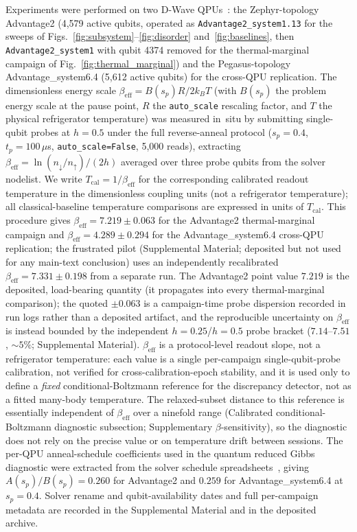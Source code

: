 \documentclass[aps,prapplied,reprint,superscriptaddress,floatfix,nofootinbib]{revtex4-2}
\begin{document}
Experiments were performed on two D-Wave QPUs~\cite{dwave2024system_docs}: the Zephyr-topology Advantage2 (4{,}579 active qubits, operated as \texttt{Advantage2\_system1.13} for the sweeps of Figs.~\ref{fig:subsystem}--\ref{fig:disorder} and~\ref{fig:baselines}, then \texttt{Advantage2\_system1} with qubit 4374 removed for the thermal-marginal campaign of Fig.~\ref{fig:thermal_marginal}) and the Pegasus-topology Advantage\_system6.4 (5{,}612 active qubits) for the cross-QPU replication.
The dimensionless energy scale $\beta_\mathrm{eff}=B(s_p)R/2k_BT$ (with $B(s_p)$ the problem energy scale at the pause point, $R$ the \texttt{auto\_scale} rescaling factor, and $T$ the physical refrigerator temperature) was measured in~situ by submitting single-qubit probes at $h=0.5$ under the full reverse-anneal protocol ($s_p=0.4$, $t_p=100\,\mu$s, \texttt{auto\_scale=False}, 5{,}000 reads), extracting $\beta_\mathrm{eff}=\ln(n_\downarrow/n_\uparrow)/(2h)$ averaged over three probe qubits from the solver nodelist.  We write $T_\mathrm{cal}=1/\beta_\mathrm{eff}$ for the corresponding calibrated readout temperature in the dimensionless coupling units (not a refrigerator temperature); all classical-baseline temperature comparisons are expressed in units of $T_\mathrm{cal}$.
This procedure gives $\beta_\mathrm{eff}=7.219\pm 0.063$ for the Advantage2 thermal-marginal campaign and $\beta_\mathrm{eff}=4.289\pm 0.294$ for the Advantage\_system6.4 cross-QPU replication; the frustrated pilot (Supplemental Material; deposited but not used for any main-text conclusion) uses an independently recalibrated $\beta_\mathrm{eff}=7.331\pm 0.198$ from a separate run.  The Advantage2 point value $7.219$ is the deposited, load-bearing quantity (it propagates into every thermal-marginal comparison); the quoted $\pm 0.063$ is a campaign-time probe dispersion recorded in run logs rather than a deposited artifact, and the reproducible uncertainty on $\beta_\mathrm{eff}$ is instead bounded by the independent $h=0.25$/$h=0.5$ probe bracket ($7.14$--$7.51$, $\sim\!5\%$; Supplemental Material).
$\beta_\mathrm{eff}$ is a protocol-level readout slope, not a refrigerator temperature: each value is a single per-campaign single-qubit-probe calibration, not verified for cross-calibration-epoch stability, and it is used only to define a \emph{fixed} conditional-Boltzmann reference for the discrepancy detector, not as a fitted many-body temperature.  The relaxed-subset distance to this reference is essentially independent of $\beta_\mathrm{eff}$ over a ninefold range (Calibrated conditional-Boltzmann diagnostic subsection; Supplementary $\beta$-sensitivity), so the diagnostic does not rely on the precise value or on temperature drift between sessions.
The per-QPU anneal-schedule coefficients used in the quantum reduced Gibbs diagnostic were extracted from the solver schedule spreadsheets~\cite{dwave2024system_docs}, giving $A(s_p)/B(s_p)=0.260$ for Advantage2 and $0.259$ for Advantage\_system6.4 at $s_p=0.4$.
Solver rename and qubit-availability dates and full per-campaign metadata are recorded in the Supplemental Material and in the deposited archive.
\end{document}
